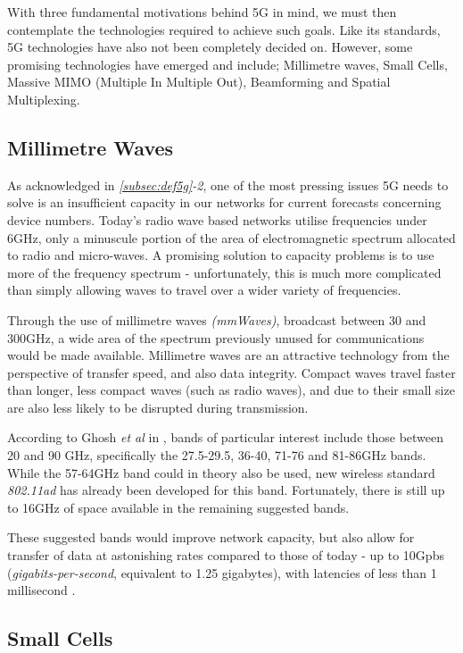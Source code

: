 \documentclass[journal]{IEEEtran}
\begin{document}
With three fundamental motivations behind 5G in mind, we must then contemplate the technologies required to achieve such goals. Like its standards, 5G technologies have also not been completely decided on. However, some promising technologies have emerged and include; Millimetre waves, Small Cells, Massive MIMO (Multiple In Multiple Out), Beamforming and Spatial Multiplexing.

\subsection{Millimetre Waves}
As acknowledged in \textit{\ref{subsec:def5g}-2}, one of the most pressing issues 5G needs to solve is an insufficient capacity in our networks for current forecasts concerning device numbers. Today's radio wave based networks utilise frequencies under 6GHz, only a minuscule portion of the area of electromagnetic spectrum allocated to radio and micro-waves. A promising solution to capacity problems is to use more of the frequency spectrum - unfortunately, this is much more complicated than simply allowing waves to travel over a wider variety of frequencies. 

Through the use of millimetre waves \textit{(mmWaves)}, broadcast between 30 and 300GHz, a wide area of the spectrum previously unused for communications would be made available. Millimetre waves are an attractive technology from the perspective of transfer speed, and also data integrity. Compact waves travel faster than longer, less compact waves (such as radio waves), and due to their small size are also less likely to be disrupted during transmission.

According to Ghosh \textit{et al} in \cite{mmwave}, bands of particular interest include those between 20 and 90 GHz, specifically the 27.5-29.5, 36-40, 71-76 and 81-86GHz bands. While the 57-64GHz band could in theory also be used, new wireless standard \textit{802.11ad} has already been developed for this band. Fortunately, there is still up to 16GHz of space available in the remaining suggested bands. 

These suggested bands would improve network capacity, but also allow for transfer of data at astonishing rates compared to those of today - up to 10Gpbs (\textit{gigabits-per-second}, equivalent to 1.25 gigabytes), with latencies of less than 1 millisecond \cite{mmwave}. 

\subsection{Small Cells}\label{subsec:smallcells}
\end{document}

